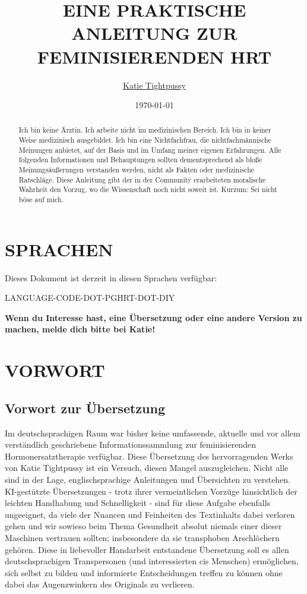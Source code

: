\documentclass{article}
\title{EINE PRAKTISCHE ANLEITUNG ZUR FEMINISIERENDEN HRT}
\author{\href{https://katea.gay/}{Katie Tightpussy}}
\date{\today}
\begin{document}
\maketitle
\tableofcontents

\begin{abstract}
    Ich bin keine Ärztin. Ich arbeite nicht im medizinischen Bereich. Ich bin in keiner Weise medizinisch ausgebildet. Ich bin eine Nichtfachfrau, die nichtfachmännische Meinungen anbietet, auf der Basis und im Umfang meiner eigenen Erfahrungen. Alle folgenden Informationen und Behauptungen sollten dementsprechend als bloße Meinungsäußerungen verstanden werden, nicht als Fakten oder medizinische Ratschläge. Diese Anleitung gibt der in der Community erarbeiteten moralische Wahrheit den Vorzug, wo die Wissenschaft noch nicht soweit ist. Kurzum: Sei nicht böse auf mich. 
\end{abstract}


\section*{SPRACHEN}

Dieses Dokument ist derzeit in diesen Sprachen verfügbar:

LANGUAGE-CODE-DOT-PGHRT-DOT-DIY

\noindent\textbf{Wenn du Interesse hast, eine Übersetzung oder eine andere Version zu machen, melde dich bitte bei Katie!}



\section{VORWORT}

\subsection*{Vorwort zur Übersetzung}

Im deutschsprachigen Raum war bisher keine umfassende, aktuelle und vor allem verständlich geschriebene Informationssammlung zur feminisierenden Hormonersatztherapie verfügbar. Diese Übersetzung des hervorragenden Werks von Katie Tightpussy ist ein Versuch, diesen Mangel auszugleichen. Nicht alle sind in der Lage, englischsprachige Anleitungen und Übersichten zu verstehen. KI-gestützte Übersetzungen - trotz ihrer vermeintlichen Vorzüge hinsichtlich der leichten Handhabung und Schnelligkeit - sind für diese Aufgabe ebenfalls ungeeignet, da viele der Nuancen und Feinheiten des Textinhalts dabei verloren gehen und wir sowieso beim Thema Gesundheit absolut niemals einer dieser Maschinen vertrauen sollten; insbesondere da sie transphoben Arschlöchern gehören. Diese in liebevoller Handarbeit entstandene Übersetzung soll es allen deutschsprachigen Transpersonen (und  interessierten cis Menschen) ermöglichen, sich selbst zu bilden und informierte Entscheidungen treffen zu können ohne dabei das Augenzwinkern des Originals zu verlieren. 
\end{document}
